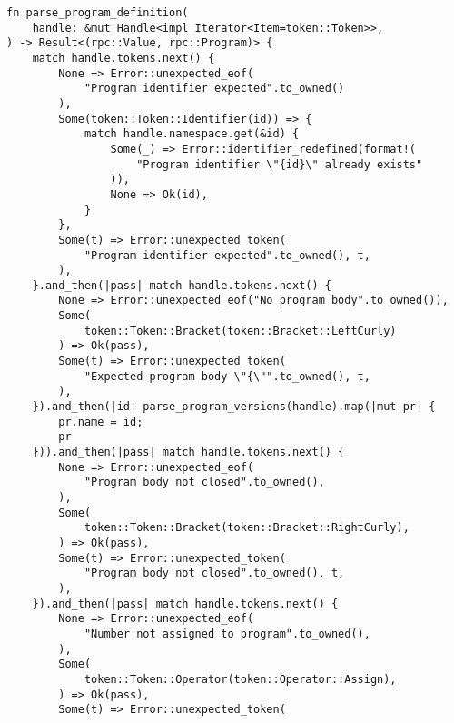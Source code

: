 \begin{lstlisting}[caption={Разбор программы (часть 1)}, label={lst:rust_parser_program1}]
fn parse_program_definition(
    handle: &mut Handle<impl Iterator<Item=token::Token>>,
) -> Result<(rpc::Value, rpc::Program)> {
    match handle.tokens.next() {
        None => Error::unexpected_eof(
            "Program identifier expected".to_owned()
        ),
        Some(token::Token::Identifier(id)) => {
            match handle.namespace.get(&id) {
                Some(_) => Error::identifier_redefined(format!(
                    "Program identifier \"{id}\" already exists"
                )),
                None => Ok(id),
            }
        },
        Some(t) => Error::unexpected_token(
            "Program identifier expected".to_owned(), t,
        ),
    }.and_then(|pass| match handle.tokens.next() {
        None => Error::unexpected_eof("No program body".to_owned()),
        Some(
            token::Token::Bracket(token::Bracket::LeftCurly)
        ) => Ok(pass),
        Some(t) => Error::unexpected_token(
            "Expected program body \"{\"".to_owned(), t,
        ),
    }).and_then(|id| parse_program_versions(handle).map(|mut pr| {
        pr.name = id;
        pr
    })).and_then(|pass| match handle.tokens.next() {
        None => Error::unexpected_eof(
            "Program body not closed".to_owned(),
        ),
        Some(
            token::Token::Bracket(token::Bracket::RightCurly),
        ) => Ok(pass),
        Some(t) => Error::unexpected_token(
            "Program body not closed".to_owned(), t,
        ),
    }).and_then(|pass| match handle.tokens.next() {
        None => Error::unexpected_eof(
            "Number not assigned to program".to_owned(),
        ),
        Some(
            token::Token::Operator(token::Operator::Assign),
        ) => Ok(pass),
        Some(t) => Error::unexpected_token(
\end{lstlisting}
\clearpage
